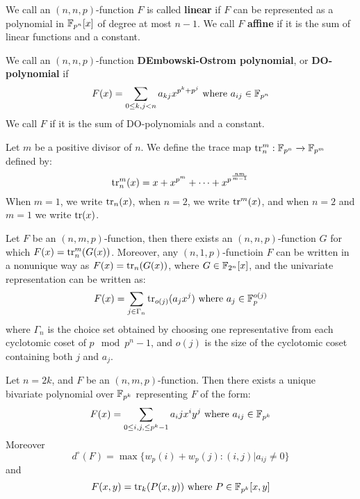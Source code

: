 \begin{definition}
  We call an $(n,n,p)$-function $F$ is called \textbf{linear} if $F$ can be
  represented as a polynomial in $\mathbb{F}_{p^n}[x]$ of degree at most $n-1$. We call
   $F$ \textbf{affine} if it is the sum of linear functions and a constant.
\end{definition}

\begin{definition}
  We call an $(n,n,p)$-function \textbf{DEmbowski-Ostrom polynomial}, or
  \textbf{DO-polynomial} if
  \begin{equation}\label{equation_1.4}
    F(x)=\sum_{0 \leq k,j<n}{a_{kj}x^{p^k+p^j}} \text{ where } a_{ij} \in
    \mathbb{F}_{p^n}
  \end{equation}
  We call $F$ if it is the sum of  DO-polynomials and a constant.
\end{definition}

\begin{defintion}
  Let $m$ be a positive divisor of $n$. We define the trace map
  $\operatorname{tr}_n^m:\mathbb{F}_{p^n} \xrightarrow{} \mathbb{F}_{p^m}$ defined by:
  \begin{equation*}
    \operatorname{tr}_n^m(x)=x+x^{p^m}+ \dots +x^{p^{\frac{nm}{m-1}}}
  \end{equation*}
  When $m=1$, we write $\operatorname{tr}_n(x)$, when $n=2$, we write $\operatorname{tr}^m(x)$, and when
  $n=2$ and $m=1$ we write $\operatorname{tr}(x)$.
\end{defintion}

\begin{lemma}\label{lemma_1.1.2}
  Let  $F$ be an $(n,m,p)$-function, then there exists an $(n,n,p)$-function $G$
  for which $F(x)=\operatorname{tr}_n^m(G(x))$. Moreover, any $(n,1,p)$-functioin $F$ can be
  written in a nonunique way as $F(x)=\operatorname{tr}_n(G(x))$, where $G \in \mathbb{F}_{2^n}[x]$,
  and the univariate representation can be written as:
  \begin{equation}\label{equation_1.5}
    F(x)=\sum_{j \in \Gamma_n}{\operatorname{tr}_{o(j)}(a_jx^j)} \text{ where } a_j \in
    \mathbb{F}_p^{o(j)}
  \end{equation}
  where $\Gamma_n$ is the choice set obtained by choosing one representative
  from each cyclotomic coset of $p \mod{p^n-1}$, and $o(j)$ is the size of the
  cyclotomic coset containing both $j$ and  $a_j$.
\end{lemma}

\begin{lemma}\label{1.1.3}
  Let $n=2k$, and $F$ be an $(n,m,p)$-function. Then there exists a unique
  bivariate polynomial over $\mathbb{F}_{p^k}$ representing $F$ of the form:
  \begin{equation}\label{equation_1.6}
    F(x)=\sum_{0 \leq i,j, \leq p^k-1}{a_ijx^iy^j} \text{ where } a_{ij} \in
    \mathbb{F}_{p^k}
  \end{equation}
  Moreover
  \begin{equation*}
    d^\circ(F)=\max{\{w_p(i)+w_p(j) : (i,j)|a_{ij} \neq 0\}}
  \end{equation*}
  and
  \begin{equation*}
    F(x,y)=\operatorname{tr}_k(P(x,y)) \text{ where } P \in \mathbb{F}_{p^k}[x,y]
  \end{equation*}
\end{lemma}

